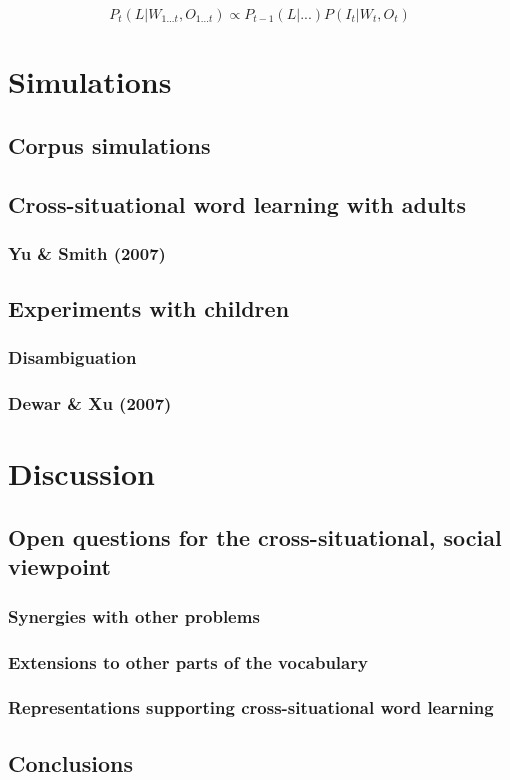 \documentclass[man,noapacite,12pt]{apa2}
\begin{document}
\begin{equation}
P_t(L|W_{1...t}, O_{1...t}) \propto P_{t-1}(L | ...) P(I_t | W_t, O_t)
\end{equation}

\section{Simulations}

\subsection{Corpus simulations}



\subsection{Cross-situational word learning with adults}

\subsubsection{Yu \& Smith (2007)}

\subsection{Experiments with children}

\subsubsection{Disambiguation}

\subsubsection{Dewar \& Xu (2007)}



\section{Discussion}



\subsection{Open questions for the cross-situational, social viewpoint}

\subsubsection{Synergies with other problems}

\subsubsection{Extensions to other parts of the vocabulary}

\subsubsection{Representations supporting cross-situational word learning}

\cite{yurovskyunderreview}

\subsection{Conclusions}

\newpage



\end{document}
